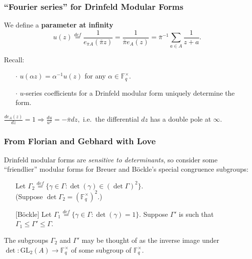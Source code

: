 \documentclass[handout]{beamer}
\numberwithin{equation}{section}
\numberwithin{case}{theorem}
\newcommand{\bbF}{\mathbb{F}}		%
\newcommand{\GL}{\mathrm{GL}} 	%
\newcommand{\<}{\left\langle}
\renewcommand{\>}{\right\rangle}
\begin{document}
	\begin{frame}
		\frametitle{``Fourier series'' for Drinfeld Modular Forms}
		\begin{definition}\label{d: parameter at infty}
			We define a \textbf{parameter at infinity} 
			\[u(z)\overset{def}{=}\frac{1}{e_{\overline{\pi}A}(\bar{\pi}z)}=\frac{1}{\bar{\pi}e_A(z)}=\bar{\pi}^{-1}\sum_{a\in A}\frac{1}{z+a}.\]
			
			\pause 
			
			Recall:
			\begin{itemize}
				\item[$\cdot$] $\displaystyle{u\left(\alpha z\right)=\alpha^{-1}u(z)}$ for any $\alpha\in \bbF_q^{\times}.$ \pause
				\item[$\cdot$] $u$-series coefficients for a Drinfeld modular form uniquely determine the form. 
			\end{itemize}
		\end{definition}
		
		
		\pause 
		\begin{lemma}
			$\displaystyle{\frac{de_A(z)}{dz}=1\Rightarrow \frac{du}{u^2} = -\overline{\pi}dz,}$ i.e.\ the differential $dz$ has a double pole at $\infty.$
		\end{lemma}
	\end{frame}
	
	\begin{frame}
		\frametitle{From Florian and Gebhard with Love}
			Drinfeld modular forms are \emph{sensitive to determinants}, so consider some ``friendlier'' modular forms for Breuer and B\"ockle's special congruence subgroups:\pause
			
			\begin{itemize}
			 	\item[]\cite{Breuer-Gekeler-h-function} Let $\Gamma_2\overset{def}{=}\{\gamma\in \Gamma:\det(\gamma)\in (\det\Gamma)^2\}.$\\ \quad (Suppose $\det\Gamma_2=(\bbF_q^{\times})^2.$) \pause
			 	\item[][B\"ockle] Let $\Gamma_1\overset{def}{=}\{\gamma\in \Gamma: \det(\gamma)=1\}.$ Suppose $\Gamma'$ is such that $\Gamma_1\leq \Gamma'\leq \Gamma.$
			\end{itemize}
			 
			\pause
			The subgroups $\Gamma_2$ and $\Gamma'$ may be thought of as the inverse image under $\det:\GL_2(A)\to \bbF_q^{\times}$ of some subgroup of $\bbF_q^{\times}.$ 
	\end{frame}
\end{document}
